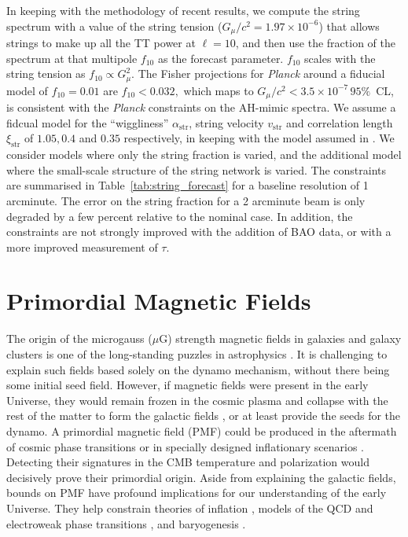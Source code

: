In keeping with the methodology of recent results, we compute the string spectrum with a value of the string tension ($G_\mu/c^2=1.97\times10^{-6}$) that allows strings to make up all the TT power at $\ell=10$, and then use the fraction of the spectrum at that multipole $f_{10}$ as the forecast parameter. $f_{10}$ scales with the string tension as $f_{10} \propto G_\mu^2.$ The Fisher projections for {\it Planck\/} around a fiducial model of $f_{10}=0.01$ are $f_{10}<0.032,$ which maps to $G_\mu/c^2 < 3.5\times 10^{-7}\, 95\%$~CL, is consistent with the {\it Planck\/} constraints on the AH-mimic spectra.
We assume a fidcual model for the ``wiggliness'' $\alpha_\mathrm{str}$, string velocity $v_\mathrm{str}$ and correlation length $\xi_\mathrm{str}$ of $1.05, 0.4$ and $0.35$ respectively, in keeping with the model assumed in \cite{Foreman:2011uj}. We consider models where only the string fraction is varied, and the additional model where the small-scale structure of the string network is varied. The constraints are summarised in Table~\ref{tab:string_forecast} for a baseline resolution of 1 arcminute. The error on the string fraction for a 2 arcminute beam is only degraded by a few percent relative to the nominal case. In addition, the constraints are not strongly improved with the addition of BAO data, or with a more improved measurement of $\tau$.


\section{Primordial Magnetic Fields}
\label{sec:PMF}
The origin of the microgauss ($\mu$G) strength magnetic fields in galaxies and galaxy clusters is one of the long-standing puzzles in astrophysics \cite{Durrer:2013pga}. It is challenging to explain such fields based solely on the dynamo mechanism, without there being some initial seed field. However, if magnetic fields were present in the early Universe, they would remain frozen in the cosmic plasma and collapse with the rest of the matter to form the galactic fields \cite{Grasso:2000wj}, or at least provide the seeds for the dynamo. A primordial magnetic field (PMF) could be produced in the aftermath of cosmic phase transitions \cite{Vachaspati:1991nm} or in specially designed inflationary scenarios \cite{Turner:1987bw,Ratra:1991bn}. Detecting their signatures in the CMB temperature and polarization would decisively prove their primordial origin. Aside from explaining the galactic fields, bounds on PMF have profound implications for our understanding of the early Universe.  They help constrain theories of inflation \cite{Bonvin:2011dt}, models of the QCD and electroweak phase transitions \cite{Caprini:2007xq}, and baryogenesis \cite{Vachaspati:2001nb}.


